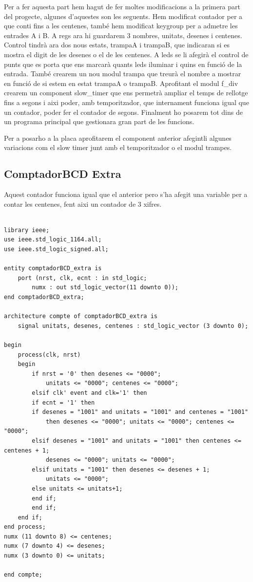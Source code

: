 \documentclass[12pt, a4papre]{article}
\begin{document}
Per a fer aquesta part hem hagut de fer moltes modificacions a la primera part del progecte, algunes d'aquestes son les seguents. Hem modificat contador per a que conti fins a les centenes, també hem modificat keygroup per a admetre les entrades A i B. A regs ara hi guardarem 3 nombres, unitats, desenes i centenes. Control tindrà ara dos nous estats, trampaA i trampaB, que indicaran si es mostra el digit de les desenes o el de les centenes. A leds se li afegirà el control de punts que es porta que ens marcarà quants leds iluminar i quins en funció de la entrada. També crearem un nou modul trampa que treurà el nombre a mostrar en funció de si estem en estat trampaA o trampaB. Aprofitant el modul f\_div crearem un component slow\_timer que ens permetrà ampliar el temps de rellotge fins a segons i aixi poder, amb temporitzador, que internament funciona igual que un contador, poder fer el contador de segons. Finalment ho posarem tot dins de un programa principal que gestionara gran part de les funcions. 

Per a posarho a la placa aprofitarem el component anterior afegintli algunes variacions com el slow timer junt amb el temporitzador o el modul trampes.

\subsection{ComptadorBCD Extra}

Aquest contador funciona igual que el anterior pero s'ha afegit una variable per a contar les centenes, fent aixi un contador de 3 xifres.

	\begin{lstlisting}[style=vhdl, frame=single, basicstyle=\tiny]

library ieee;
use ieee.std_logic_1164.all;
use ieee.std_logic_signed.all;

entity comptadorBCD_extra is
	port (nrst, clk, ecnt : in std_logic;
		numx : out std_logic_vector(11 downto 0));
end comptadorBCD_extra;

architecture compte of comptadorBCD_extra is 
	signal unitats, desenes, centenes : std_logic_vector (3 downto 0);
	
begin 
	process(clk, nrst)
	begin
	    if nrst = '0' then desenes <= "0000";
			unitats <= "0000"; centenes <= "0000";
	    elsif clk' event and clk='1' then
		if ecnt = '1' then
		if desenes = "1001" and unitats = "1001" and centenes = "1001" 
			then desenes <= "0000"; unitats <= "0000"; centenes <= "0000";
		elsif desenes = "1001" and unitats = "1001" then centenes <= centenes + 1;
			desenes <= "0000"; unitats <= "0000";
		elsif unitats = "1001" then desenes <= desenes + 1;
			unitats <= "0000";
		else unitats <= unitats+1;
		end if;
	    end if;
	end if;
end process;
numx (11 downto 8) <= centenes;
numx (7 downto 4) <= desenes;
numx (3 downto 0) <= unitats;

end compte;

		\end{lstlisting}
		
\end{document}
